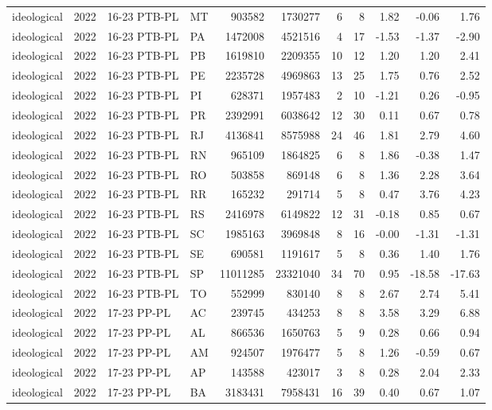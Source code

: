 \begin{landscape}
\begin{longtable}{lllL{1.4cm}rrrrrrr}
ideological & 2022 & 16-23 PTB-PL & MT & 903582 & 1730277 & 6 & 8 & 1.82 & -0.06 & 1.76 \\
ideological & 2022 & 16-23 PTB-PL & PA & 1472008 & 4521516 & 4 & 17 & -1.53 & -1.37 & -2.90 \\
ideological & 2022 & 16-23 PTB-PL & PB & 1619810 & 2209355 & 10 & 12 & 1.20 & 1.20 & 2.41 \\
ideological & 2022 & 16-23 PTB-PL & PE & 2235728 & 4969863 & 13 & 25 & 1.75 & 0.76 & 2.52 \\
ideological & 2022 & 16-23 PTB-PL & PI & 628371 & 1957483 & 2 & 10 & -1.21 & 0.26 & -0.95 \\
ideological & 2022 & 16-23 PTB-PL & PR & 2392991 & 6038642 & 12 & 30 & 0.11 & 0.67 & 0.78 \\
ideological & 2022 & 16-23 PTB-PL & RJ & 4136841 & 8575988 & 24 & 46 & 1.81 & 2.79 & 4.60 \\
ideological & 2022 & 16-23 PTB-PL & RN & 965109 & 1864825 & 6 & 8 & 1.86 & -0.38 & 1.47 \\
ideological & 2022 & 16-23 PTB-PL & RO & 503858 & 869148 & 6 & 8 & 1.36 & 2.28 & 3.64 \\
ideological & 2022 & 16-23 PTB-PL & RR & 165232 & 291714 & 5 & 8 & 0.47 & 3.76 & 4.23 \\
ideological & 2022 & 16-23 PTB-PL & RS & 2416978 & 6149822 & 12 & 31 & -0.18 & 0.85 & 0.67 \\
ideological & 2022 & 16-23 PTB-PL & SC & 1985163 & 3969848 & 8 & 16 & -0.00 & -1.31 & -1.31 \\
ideological & 2022 & 16-23 PTB-PL & SE & 690581 & 1191617 & 5 & 8 & 0.36 & 1.40 & 1.76 \\
ideological & 2022 & 16-23 PTB-PL & SP & 11011285 & 23321040 & 34 & 70 & 0.95 & -18.58 & -17.63 \\
ideological & 2022 & 16-23 PTB-PL & TO & 552999 & 830140 & 8 & 8 & 2.67 & 2.74 & 5.41 \\
ideological & 2022 & 17-23 PP-PL & AC & 239745 & 434253 & 8 & 8 & 3.58 & 3.29 & 6.88 \\
ideological & 2022 & 17-23 PP-PL & AL & 866536 & 1650763 & 5 & 9 & 0.28 & 0.66 & 0.94 \\
ideological & 2022 & 17-23 PP-PL & AM & 924507 & 1976477 & 5 & 8 & 1.26 & -0.59 & 0.67 \\
ideological & 2022 & 17-23 PP-PL & AP & 143588 & 423017 & 3 & 8 & 0.28 & 2.04 & 2.33 \\
ideological & 2022 & 17-23 PP-PL & BA & 3183431 & 7958431 & 16 & 39 & 0.40 & 0.67 & 1.07 \\

\end{longtable}
\end{landscape}
